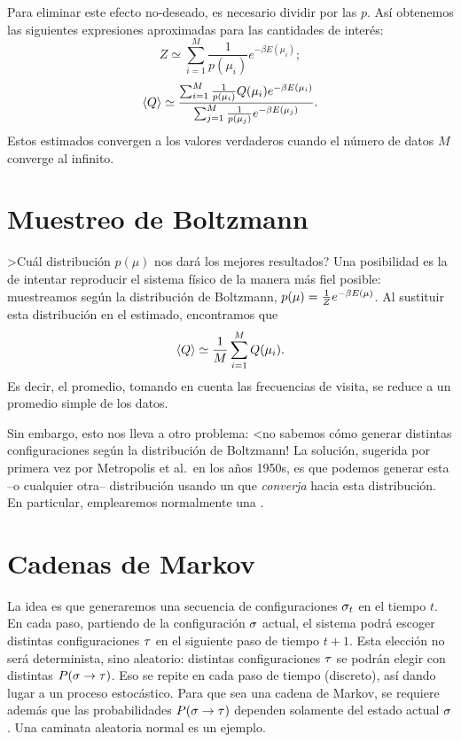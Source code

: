 Para eliminar este efecto no-deseado, es necesario dividir por las $p$. Así
obtenemos las siguientes expresiones aproximadas para las cantidades de interés:
\begin{equation}
 Z \simeq  \sum_{i=1}^M \frac{1}{p(\mu_i)} e^{-\beta
E(\mu_i)};
\end{equation}
\begin{equation}
 \mean{Q} \simeq \frac{\sum_{i=1}^M \textfrac{1}{p(\mu_i)} Q(\mu_i) e^{-\beta
E(\mu_i)}}{\sum_{j=1}^M \textfrac{1}{p(\mu_j)} e^{-\beta
E(\mu_j)}}.
\end{equation}
Estos estimados convergen a los valores verdaderos cuando el número de datos $M$
converge al infinito.
 
\section{Muestreo de Boltzmann}
>Cuál distribución $p(\mu)$ nos dará los mejores resultados? Una posibilidad es la de intentar reproducir el sistema físico de la manera más fiel posible: muestreamos según la distribución de Boltzmann, $p(\mu) = \textfrac{1}{Z} e^{-\beta E(\mu)}$. Al sustituir esta distribución en el estimado, encontramos que
\begin{equation}
 \mean{Q} \simeq \frac{1}{M} \sum_{i=1}^M Q(\mu_i).
\end{equation}
Es decir, el promedio, tomando en cuenta las frecuencias de visita, se reduce a un promedio simple de los datos.

Sin embargo, esto nos lleva a otro problema: <no sabemos cómo generar distintas configuraciones según la distribución de Boltzmann!
La solución, sugerida por primera vez por Metropolis et al.~en los años 1950s, es que podemos generar esta --o cualquier otra-- distribución usando un  que \emph{converja} hacia esta distribución. En particular, emplearemos normalmente una .

\section{Cadenas de Markov}
La idea es que generaremos una secuencia de configuraciones $\ss_t$ en el tiempo $t$. En cada paso, partiendo de la configuración $\ss$ actual, el sistema podrá escoger distintas configuraciones $\tt$ en el siguiente paso de tiempo $t+1$. Esta elección no será determinista, sino aleatorio: distintas configuraciones $\tt$ se podrán elegir con distintas  $P(\ss \to \tt)$.  Eso se repite en cada paso de tiempo (discreto), así dando lugar a un proceso estocástico. Para que sea una cadena de Markov, se requiere además que las probabilidades $P(\ss \to \tt)$ dependen solamente del estado actual $\ss$. Una caminata aleatoria normal es un ejemplo.

